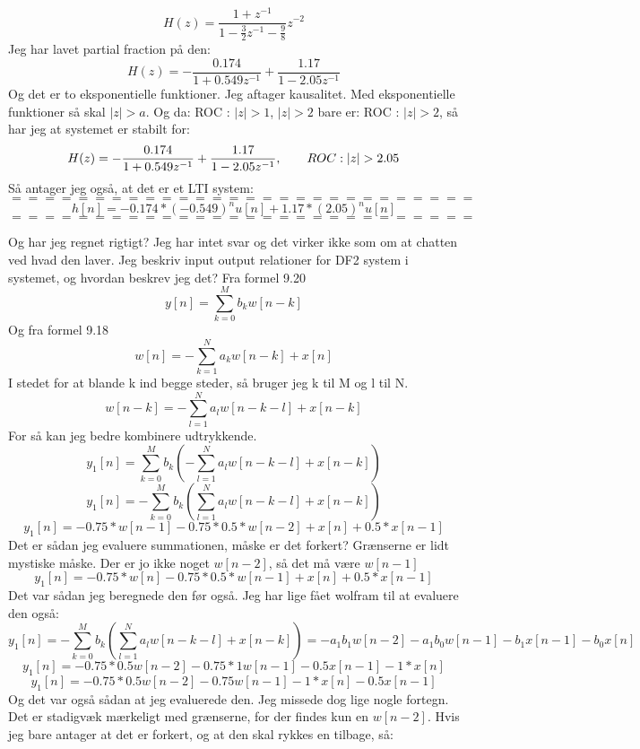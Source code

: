 \begin{Opgaver}
\begin{kapitel}
\begin{Opgave}[Opgave 9.28]
\begin{UnderOpgave}
                \[H(z) = \frac{1 + z^{-1}}{1 - \frac{3}{2}z^{-1} -\frac{9}{8}}z^{-2}\]
                Jeg har lavet partial fraction på den: 
                \[H(z) = -\frac{0.174}{1 + 0.549z^{-1}} + \frac{1.17}{1 - 2.05z^{-1}}\]
                Og det er to eksponentielle funktioner. 
                Jeg aftager kausalitet. Med eksponentielle funktioner så skal $|z| > a$.
                Og da: 
                ROC : $|z| > 1$, $|z| > 2$
                bare er: 
                ROC : $|z| > 2$, så har jeg at systemet er stabilt for: 
                \[H(z) = -\frac{0.174}{1 + 0.549z^{-1}} + \frac{1.17}{1 - 2.05z^{-1}}, \tab{1} ROC : |z| > 2.05\]
                Så antager jeg også, at det er et LTI system: 
                \[============================\]
                \[h[n] = -0.174 * (-0.549)^nu[n] + 1.17 * (2.05)^nu[n]\]
                \[============================\]
            \end{UnderOpgave}
            Og har jeg regnet rigtigt? Jeg har intet svar og det virker ikke som om at chatten ved hvad den laver. 
            Jeg beskriv input output relationer for DF2 system i systemet, og hvordan beskrev jeg det?
            Fra formel 9.20 
            \[y[n]=\sum_{k=0}^{M}b_{k}w[n-k]\]
            Og fra formel 9.18
            \[w[n]=-\sum_{k=1}^{N}a_{k}w[n-k]+x[n]\]
            I stedet for at blande k ind begge steder, så bruger jeg k til M og l til N. 
            \[w[n - k]=-\sum_{l=1}^{N}a_{l}w[n - k - l]+x[n - k]\]
            For så kan jeg bedre kombinere udtrykkende.
            \[y_1[n]=\sum_{k=0}^{M}b_{k}(-\sum_{l=1}^{N}a_{l}w[n - k - l]+x[n - k])\]
            \[y_1[n]= - \sum_{k=0}^{M}b_{k}(\sum_{l=1}^{N}a_{l}w[n - k - l]+x[n - k])\]
            \[y_1[n]= - 0.75 * w[n - 1] - 0.75 * 0.5 * w[n - 2] + x[n] + 0.5*x[n - 1]\]
            Det er sådan jeg evaluere summationen, måske er det forkert? Grænserne er lidt mystiske måske. Der er jo ikke noget $w[n - 2]$, så det må være $w[n - 1]$
            \[y_1[n]= - 0.75 * w[n] - 0.75 * 0.5 * w[n - 1] + x[n] + 0.5*x[n - 1]\]
            Det var sådan jeg beregnede den før også.
            Jeg har lige fået wolfram til at evaluere den også: 
            \[y_1[n] = - \sum_{k=0}^{M}b_{k}(\sum_{l=1}^{N}a_{l}w[n - k - l]+x[n - k]) = -a_1b_1w[n - 2] - a_1b_0w[n - 1] - b_1x[n - 1] - b_0x[n]\]
            \[y_1[n] = -0.75*0.5w[n - 2] - 0.75*1w[n - 1] - 0.5x[n - 1] - 1 * x[n]\]
            \[y_1[n] = -0.75*0.5w[n - 2] - 0.75w[n - 1] - 1 * x[n] - 0.5x[n - 1]\]
            Og det var også sådan at jeg evaluerede den. Jeg missede dog lige nogle fortegn. 
            Det er stadigvæk mærkeligt med grænserne, for der findes kun en $w[n - 2]$. Hvis jeg bare antager at det er forkert, og at den skal rykkes en tilbage, så: 

\end{Opgave}
\end{kapitel}
\end{Opgaver}
